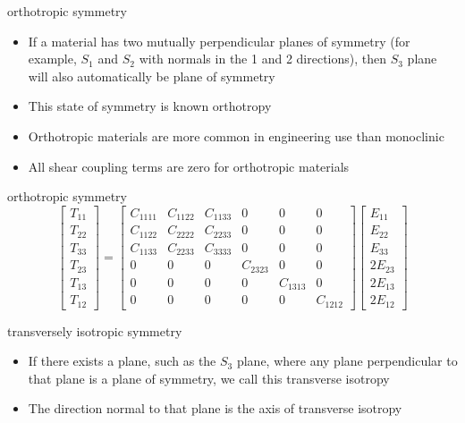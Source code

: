 \documentclass[
  letterpaper,
  ignorenonframetext,
  aspectratio=43,
  handout,
  12pt]{beamer}
\providecommand{\tightlist}{%
  \setlength{\itemsep}{0pt}\setlength{\parskip}{0pt}}
\providecommand{\tightlist}{%
\setlength{\itemsep}{0pt}\setlength{\parskip}{0pt}}
\begin{document}
\begin{frame}{orthotropic symmetry}
\protect\hypertarget{orthotropic-symmetry}{}
\begin{itemize}
\tightlist
\item
  If a material has two mutually perpendicular planes of symmetry (for
  example, \(S_1\) and \(S_2\) with normals in the 1 and 2 directions),
  then \(S_3\) plane will also automatically be plane of symmetry
\item
  This state of symmetry is known orthotropy
\item
  Orthotropic materials are more common in engineering use than
  monoclinic
\item
  All shear coupling terms are zero for orthotropic materials
\end{itemize}
\end{frame}

\begin{frame}{orthotropic symmetry}
\protect\hypertarget{orthotropic-symmetry-1}{}
\[\begin{bmatrix}
    T_{11} \\ T_{22} \\ T_{33} \\ T_{23} \\ T_{13} \\ T_{12}
\end{bmatrix}
= \begin{bmatrix}
    C_{1111} & C_{1122} & C_{1133} & 0 & 0 & 0 \\
    C_{1122} & C_{2222} & C_{2233} & 0 & 0 & 0 \\
    C_{1133} & C_{2233} & C_{3333} & 0 & 0 & 0 \\
    0 & 0 & 0 & C_{2323} & 0 & 0 \\
    0 & 0 & 0 & 0 & C_{1313} & 0 \\
    0 & 0 & 0 & 0 & 0 & C_{1212}
\end{bmatrix}\begin{bmatrix}
    E_{11} \\ E_{22} \\ E_{33} \\ 2E_{23} \\ 2E_{13} \\ 2E_{12}
\end{bmatrix}\]
\end{frame}

\begin{frame}{transversely isotropic symmetry}
\protect\hypertarget{transversely-isotropic-symmetry}{}
\begin{itemize}
\tightlist
\item
  If there exists a plane, such as the \(S_3\) plane, where any plane
  perpendicular to that plane is a plane of symmetry, we call this
  transverse isotropy
\item
  The direction normal to that plane is the axis of transverse isotropy
\end{itemize}
\end{frame}
\end{document}

